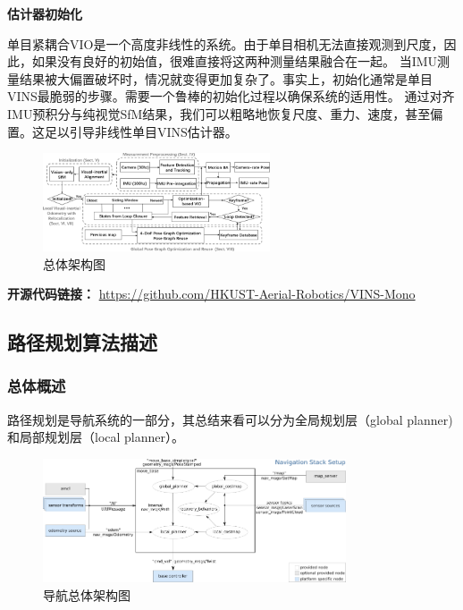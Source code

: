 \documentclass[cs4size,a4paper]{ctexart}
\numberwithin{equation}{section}
\numberwithin{table}{section}
\numberwithin{figure}{section}
\begin{document}
\textbf{估计器初始化}

单目紧耦合VIO是一个高度非线性的系统。由于单目相机无法直接观测到尺度，因此，如果没有良好的初始值，很难直接将这两种测量结果融合在一起。
当IMU测量结果被大偏置破坏时，情况就变得更加复杂了。事实上，初始化通常是单目VINS最脆弱的步骤。需要一个鲁棒的初始化过程以确保系统的适用性。
通过对齐IMU预积分与纯视觉SfM结果，我们可以粗略地恢复尺度、重力、速度，甚至偏置。这足以引导非线性单目VINS估计器。

\begin{figure}[H]
        \centering
        \includegraphics[width=0.6\textwidth]{figure/vins2.png}
        \caption{总体架构图}
\end{figure}

\textbf{开源代码链接：}
\url{https://github.com/HKUST-Aerial-Robotics/VINS-Mono}

\subsection{路径规划算法描述}

\subsubsection{总体概述}
路径规划是导航系统的一部分，其总结来看可以分为全局规划层（global planner)和局部规划层（local planner）。


\begin{figure}[h]
        \centering
        \includegraphics[width=0.8\textwidth]{figure/navigation.png}
        \caption{导航总体架构图}
\end{figure}
\end{document}
